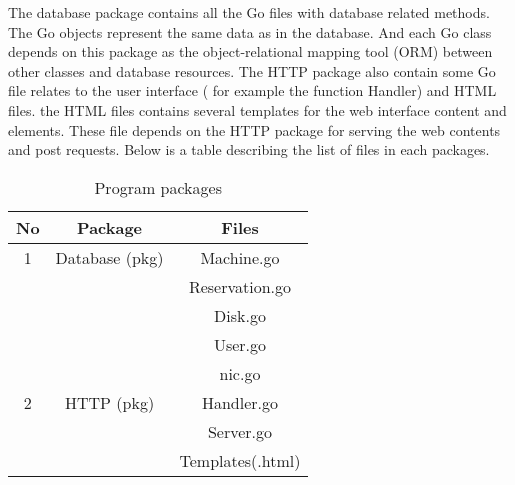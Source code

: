 The database package contains all the Go files with database related methods. The Go objects represent the same data as in the database. And each Go class depends on this package as the object-relational mapping tool (ORM) between other classes and database resources. The HTTP package also contain some Go file relates to the user interface ( for example the function Handler) and HTML files. the HTML files contains several templates for the web interface content and elements. These file depends on the HTTP package for serving the web contents and post requests. Below is a table describing the list of files in each packages.
\pagebreak
\begin{table}[h!]
  \centering
  \label{tab:table1}
  \begin{tabular}{ccc}
    \hline
    No & Package & Files\\
   \hline
    1 &Database (pkg)& Machine.go\\
       &&Reservation.go\\
      &&Disk.go\\
      &&User.go\\
      &&nic.go\\
    \hline
    2 &HTTP (pkg)& Handler.go\\
    &&Server.go\\
    &&Templates(.html)\\
    \hline
  \end{tabular}
  \caption{Program packages}
\end{table}

